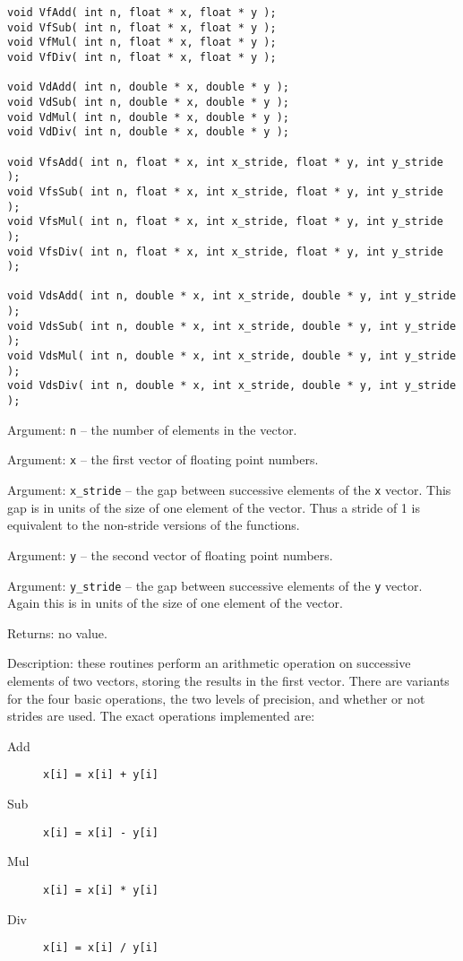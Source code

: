 \begin{verbatim}
void VfAdd( int n, float * x, float * y );
void VfSub( int n, float * x, float * y );
void VfMul( int n, float * x, float * y );
void VfDiv( int n, float * x, float * y );

void VdAdd( int n, double * x, double * y );
void VdSub( int n, double * x, double * y );
void VdMul( int n, double * x, double * y );
void VdDiv( int n, double * x, double * y );

void VfsAdd( int n, float * x, int x_stride, float * y, int y_stride );
void VfsSub( int n, float * x, int x_stride, float * y, int y_stride );
void VfsMul( int n, float * x, int x_stride, float * y, int y_stride );
void VfsDiv( int n, float * x, int x_stride, float * y, int y_stride );

void VdsAdd( int n, double * x, int x_stride, double * y, int y_stride );
void VdsSub( int n, double * x, int x_stride, double * y, int y_stride );
void VdsMul( int n, double * x, int x_stride, double * y, int y_stride );
void VdsDiv( int n, double * x, int x_stride, double * y, int y_stride );
\end{verbatim}

Argument: {\tt n} -- the number of elements in the vector.

Argument: {\tt x} -- the first vector of floating point numbers.

Argument: \verb+x_stride+ -- the gap between successive elements of
the {\tt x} vector.  This gap is in units of the size of one element
of the vector.  Thus a stride of 1 is equivalent to the non-stride
versions of the functions.

Argument: {\tt y} -- the second vector of floating point numbers.

Argument: \verb+y_stride+ -- the gap between successive elements of the
{\tt y} vector.  Again this is in units of the size of one element of
the vector.

Returns: no value.

Description: these routines perform an arithmetic operation on successive
elements of two vectors, storing the results in the first vector. There
are variants for the four basic operations, the two levels of precision,
and whether or not strides are used. The exact operations implemented are:

\begin{description}
\item [Add] \verb_x[i] = x[i] + y[i]_
\item [Sub] \verb_x[i] = x[i] - y[i]_
\item [Mul] \verb_x[i] = x[i] * y[i]_
\item [Div] \verb_x[i] = x[i] / y[i]_
\end{description}


